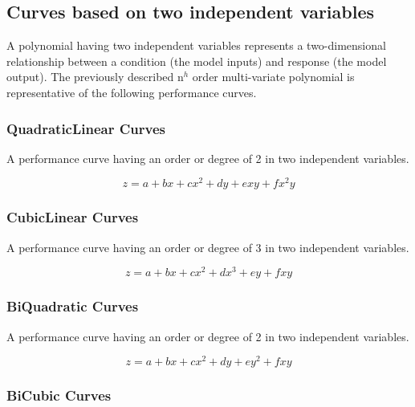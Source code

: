 \subsection{Curves based on two independent variables}\label{curves-based-on-two-independent-variables}

A polynomial having two independent variables represents a two-dimensional relationship between a condition (the model inputs) and response (the model output). The previously described n\(^{h}\) order multi-variate polynomial is representative of the following performance curves.

\subsubsection{QuadraticLinear Curves}\label{quadraticlinear-curves}

A performance curve having an order or degree of 2 in two independent variables.

\begin{equation}
z = a + bx + c{x^2} + dy + exy + f{x^2}y
\end{equation}

\subsubsection{CubicLinear Curves}\label{cubiclinear-curves}

A performance curve having an order or degree of 3 in two independent variables.

\begin{equation}
z = a + bx + c{x^2} + d{x^3} + ey + fxy
\end{equation}

\subsubsection{BiQuadratic Curves}\label{biquadratic-curves}

A performance curve having an order or degree of 2 in two independent variables.

\begin{equation}
z = a + bx + c{x^2} + dy + e{y^2} + fxy
\end{equation}

\subsubsection{BiCubic Curves}\label{bicubic-curves}

